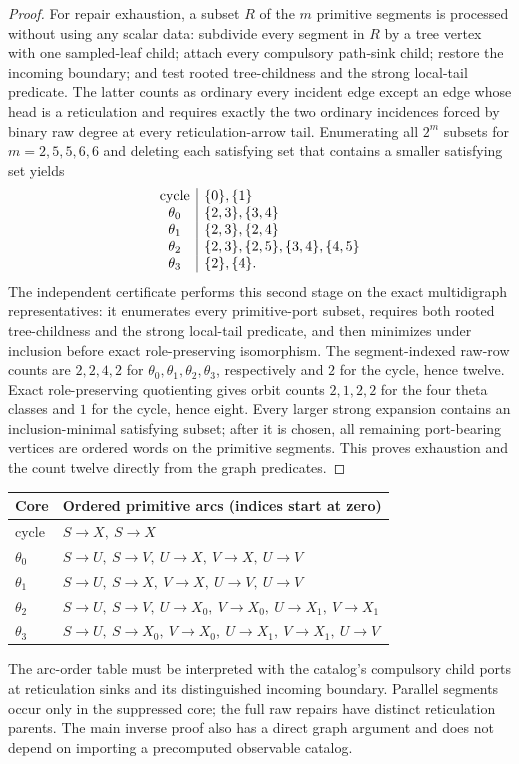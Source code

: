 \documentclass[11pt]{article}
\begin{document}
\begin{proof}
For repair exhaustion, a subset $R$ of the $m$ primitive segments is processed
without using any scalar data: subdivide every segment in $R$ by a tree vertex
with one sampled-leaf child; attach every compulsory path-sink child; restore
the incoming boundary; and test rooted tree-childness and the strong local-tail
predicate.  The latter counts as ordinary every incident edge except an edge
whose head is a reticulation and requires exactly the two ordinary incidences
forced by binary raw degree at every reticulation-arrow tail.  Enumerating all
$2^m$ subsets for $m=2,5,5,6,6$ and deleting each satisfying set that contains
a smaller satisfying set yields
\[
\begin{array}{c|l}
\text{cycle}&\{0\},\{1\}\cr
\theta_0&\{2,3\},\{3,4\}\cr
\theta_1&\{2,3\},\{2,4\}\cr
\theta_2&\{2,3\},\{2,5\},\{3,4\},\{4,5\}\cr
\theta_3&\{2\},\{4\}.
\end{array}
\]
The independent certificate performs this second stage on the exact
multidigraph representatives: it enumerates every primitive-port subset,
requires both rooted tree-childness and the strong local-tail predicate, and
then minimizes under inclusion before exact role-preserving isomorphism.  The
segment-indexed raw-row counts are $2,2,4,2$ for $\theta_0,\theta_1,\theta_2,\theta_3$, respectively and
$2$ for the cycle, hence twelve.  Exact role-preserving quotienting gives
orbit counts $2,1,2,2$ for the four theta classes and $1$ for the cycle, hence
eight.
Every larger strong expansion contains an inclusion-minimal satisfying subset;
after it is chosen, all remaining port-bearing vertices are ordered words on
the primitive segments.  This proves exhaustion and the count twelve directly
from the graph predicates.
\end{proof}


\begin{center}\small
\begin{tabular}{@{}ll@{}}\toprule
Core & Ordered primitive arcs (indices start at zero)\\\midrule
cycle & $S\to X,\ S\to X$\\
$\theta_0$ & $S\to U,\ S\to V,\ U\to X,\ V\to X,\ U\to V$\\
$\theta_1$ & $S\to U,\ S\to X,\ V\to X,\ U\to V,\ U\to V$\\
$\theta_2$ & $S\to U,\ S\to V,\ U\to X_0,\ V\to X_0,\ U\to X_1,\ V\to X_1$\\
$\theta_3$ & $S\to U,\ S\to X_0,\ V\to X_0,\ U\to X_1,\ V\to X_1,\ U\to V$\\\bottomrule
\end{tabular}
\end{center}
The arc-order table must be interpreted with the catalog's compulsory child ports at reticulation sinks and its distinguished incoming boundary. Parallel segments occur only in the suppressed core; the full raw repairs have distinct reticulation parents. The main inverse proof also has a direct graph argument and does not depend on importing a precomputed observable catalog.
\end{document}
